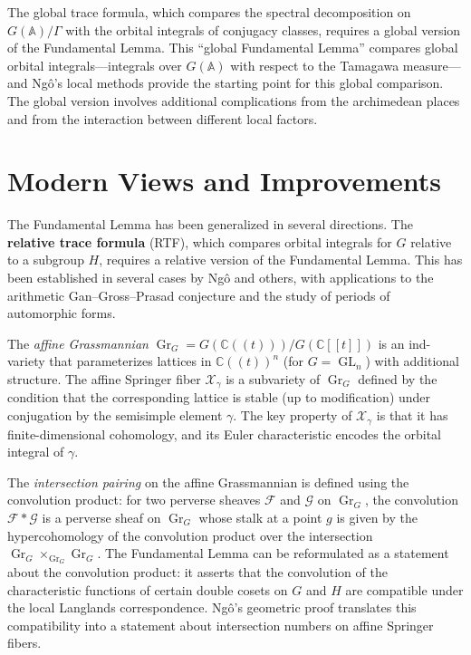 The global trace formula, which compares the spectral decomposition on $G(\mathbb{A})/\Gamma$ with the orbital integrals of conjugacy classes, requires a global version of the Fundamental Lemma. This ``global Fundamental Lemma'' compares global orbital integrals---integrals over $G(\mathbb{A})$ with respect to the Tamagawa measure---and Ngô's local methods provide the starting point for this global comparison. The global version involves additional complications from the archimedean places and from the interaction between different local factors.

\section{Modern Views and Improvements}\label{ch2010ngobaochau:modern-views-and-improvements}

The Fundamental Lemma has been generalized in several directions. The \textbf{relative trace formula} (RTF), which compares orbital integrals for $G$ relative to a subgroup $H$, requires a relative version of the Fundamental Lemma. This has been established in several cases by Ngô and others, with applications to the arithmetic Gan--Gross--Prasad conjecture and the study of periods of automorphic forms.

The \emph{affine Grassmannian} $\operatorname{Gr}_G = G(\mathbb{C}((t))) / G(\mathbb{C}[[t]])$ is an ind-variety that parameterizes lattices in $\mathbb{C}((t))^n$ (for $G = \operatorname{GL}_n$) with additional structure. The affine Springer fiber $\mathcal{X}_\gamma$ is a subvariety of $\operatorname{Gr}_G$ defined by the condition that the corresponding lattice is stable (up to modification) under conjugation by the semisimple element $\gamma$. The key property of $\mathcal{X}_\gamma$ is that it has finite-dimensional cohomology, and its Euler characteristic encodes the orbital integral of $\gamma$.

The \emph{intersection pairing} on the affine Grassmannian is defined using the convolution product: for two perverse sheaves $\mathcal{F}$ and $\mathcal{G}$ on $\operatorname{Gr}_G$, the convolution $\mathcal{F} * \mathcal{G}$ is a perverse sheaf on $\operatorname{Gr}_G$ whose stalk at a point $g$ is given by the hypercohomology of the convolution product over the intersection $\operatorname{Gr}_G \times_{\operatorname{Gr}_G} \operatorname{Gr}_G$. The Fundamental Lemma can be reformulated as a statement about the convolution product: it asserts that the convolution of the characteristic functions of certain double cosets on $G$ and $H$ are compatible under the local Langlands correspondence. Ngô's geometric proof translates this compatibility into a statement about intersection numbers on affine Springer fibers.

